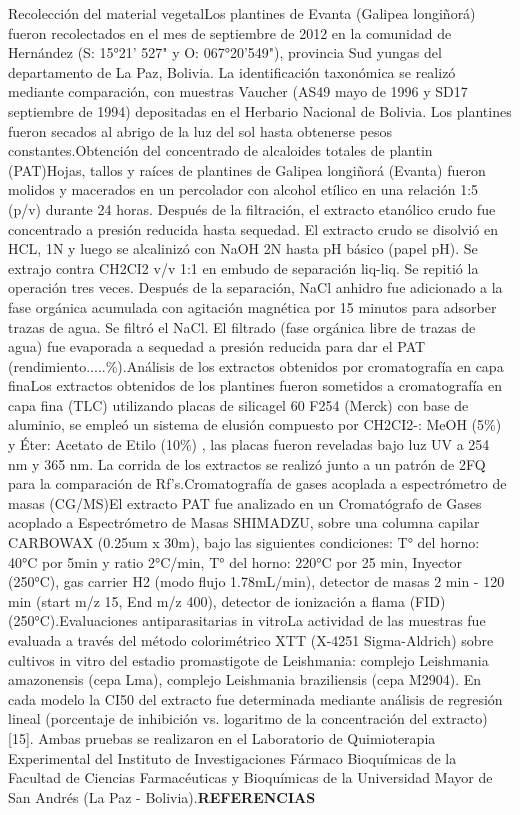 \documentclass{article}
\begin{document}
Recolección del material vegetalLos plantines de Evanta (Galipea longiñorá) fueron recolectados en el mes de septiembre de 2012 en la comunidad de Hernández (S: 15°21' 527" y O: 067°20'549"), provincia Sud yungas del departamento de La Paz, Bolivia. La identificación taxonómica se realizó mediante comparación, con muestras Vaucher (AS49 mayo de 1996 y SD17 septiembre de 1994) depositadas en el Herbario Nacional de Bolivia. Los plantines fueron secados al abrigo de la luz del sol hasta obtenerse pesos constantes.Obtención del concentrado de alcaloides totales de plantin (PAT)Hojas, tallos y raíces de plantines de Galipea longiñorá (Evanta) fueron molidos y macerados en un percolador con alcohol etílico en una relación 1:5 (p/v) durante 24 horas. Después de la filtración, el extracto etanólico crudo fue concentrado a presión reducida hasta sequedad. El extracto crudo se disolvió en HCL, 1N y luego se alcalinizó con NaOH 2N hasta pH básico (papel pH). Se extrajo contra CH2CI2 v/v 1:1 en embudo de separación liq-liq. Se repitió la operación tres veces. Después de la separación, NaCl anhidro fue adicionado a la fase orgánica acumulada con agitación magnética por 15 minutos para adsorber trazas de agua. Se filtró el NaCl. El filtrado (fase orgánica libre de trazas de agua) fue evaporada a sequedad a presión reducida para dar el PAT (rendimiento.....\%).Análisis de los extractos obtenidos por cromatografía en capa finaLos extractos obtenidos de los plantines fueron sometidos a cromatografía en capa fina (TLC) utilizando placas de silicagel 60 F254 (Merck) con base de aluminio, se empleó un sistema de elusión compuesto por CH2CI2-: MeOH (5\%) y Éter: Acetato de Etilo (10\%) , las placas fueron reveladas bajo luz UV a 254 nm y 365 nm. La corrida de los extractos se realizó junto a un patrón de 2FQ para la comparación de Rf's.Cromatografía de gases acoplada a espectrómetro de masas (CG/MS)El extracto PAT fue analizado en un Cromatógrafo de Gases acoplado a Espectrómetro de Masas SHIMADZU, sobre una columna capilar CARBOWAX (0.25um x 30m), bajo las siguientes condiciones: T° del horno: 40°C por 5min y ratio 2°C/min, T° del horno: 220°C por 25 min, Inyector (250°C), gas carrier H2 (modo flujo 1.78mL/min), detector de masas 2 min - 120 min (start m/z 15, End m/z 400), detector de ionización a flama (FID) (250°C).Evaluaciones antiparasitarias in vitroLa actividad de las muestras fue evaluada a través del método colorimétrico XTT (X-4251 Sigma-Aldrich) sobre cultivos in vitro del estadio promastigote de Leishmania: complejo Leishmania amazonensis (cepa Lma), complejo Leishmania braziliensis (cepa M2904). En cada modelo la CI50 del extracto fue determinada mediante análisis de regresión lineal (porcentaje de inhibición vs. logaritmo de la concentración del extracto) [15]. Ambas pruebas se realizaron en el Laboratorio de Quimioterapia Experimental del Instituto de Investigaciones Fármaco Bioquímicas de la Facultad de Ciencias Farmacéuticas y Bioquímicas de la Universidad Mayor de San Andrés (La Paz - Bolivia).\textbf{REFERENCIAS}
\end{document}
